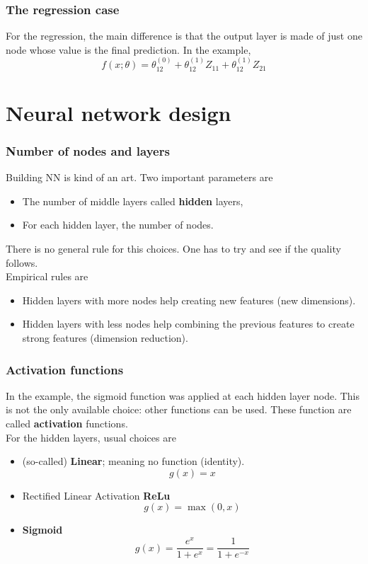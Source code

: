 \begin{frame}
\frametitle{The regression case}
For the regression, the main difference is that the output layer is made of just one node whose value is the final prediction. In the example, 
$$
f(x;\theta) = \theta_{12}^{(0)} + \theta_{12}^{(1)} Z_{11} + \theta_{12}^{(1)} Z_{21}
$$
\end{frame}
\section{Neural network design}
\begin{frame}
\frametitle{Number of nodes and layers}
Building NN is kind of an art. Two important parameters are
\begin{itemize}
\item The number of middle layers called {\bf hidden} layers,
\item For each hidden layer, the number of nodes.
\end{itemize}
There is no general rule for this choices. One has to try and see if the quality follows.\\
\vspace{0.3cm} 
Empirical rules are
\begin{itemize}
\item Hidden layers with more nodes help creating new features (new dimensions).
\item Hidden layers with less nodes help combining the previous features to create strong features (dimension reduction).
\end{itemize}
\end{frame}
\begin{frame}
\frametitle{Activation functions}
In the example, the sigmoid function was applied at each hidden layer node. This is not the only available choice: other functions can be used. These function are called {\bf activation} functions.\\
\vspace{0.3cm}
For the hidden layers, usual choices are
\begin{itemize}
\item (so-called) {\bf Linear}; meaning no function (identity).
$$
g(x) = x
$$
\item Rectified Linear Activation {\bf ReLu}
$$
g(x) = \max(0,x)
$$
\item {\bf Sigmoid}
$$
g(x) = \frac{e^x}{1+e^x} = \frac{1}{1+e^{-x}}
$$
\end{itemize}
\end{frame}

